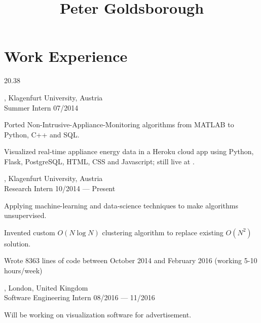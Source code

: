 




\begin{header}
	\title{Peter Goldsborough}
	\separate
	\separate
\end{header}

\section{Work Experience}{2}{0.38}

\begin{entry}
	{, Klagenfurt University, Austria}
	{\\Summer Intern}
	{07/2014}

	\item Ported Non-Intrusive-Appliance-Monitoring algorithms from MATLAB to Python, C++ and SQL.
	\item Visualized real-time appliance energy data in a Heroku cloud app using Python, Flask, PostgreSQL, HTML, CSS and Javascript; still live at .
\end{entry}

\begin{entry}
	{, Klagenfurt University, Austria}
	{\\Research Intern}
	{10/2014 --- Present}
  \item Applying machine-learning and data-science techniques to make algorithms unsupervised.
	\item Invented custom $O(N \log N)$ clustering algorithm to replace existing $O(N^2)$ solution.
	\item Wrote 8363 lines of code between October 2014 and February 2016 (working
        5-10 hours/week)
\end{entry}

\begin{entry}
	{, London, United Kingdom}
	{\\Software Engineering Intern}
	{08/2016 --- 11/2016}
	\item Will be working on visualization software for advertisement.
\end{entry}

